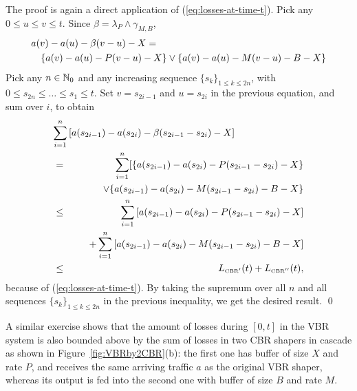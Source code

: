 \pr The proof is again a direct application of (\ref{eq:losses-at-time-t}).
Pick any $0 \leq u \leq v \leq t$. Since $\beta = \lambda_P \wedge \gamma_{M,B}$,
\begin{eqnarray*}
\lefteqn{a(v) - a(u) - \beta(v-u) - X = }\\ && \{ a(v) - a(u) -
P(v-u) - X \} \vee \{ a(v) - a(u) - M(v-u) - B - X \}
\end{eqnarray*}
Pick any $n \in \mathbb{N}_0$ and any increasing sequence $\{ s_k \}_{1 \leq k \leq 2n}$, with $0 \leq s_{2n} \leq \ldots \leq s_1 \leq t$. Set $v = s_{2i-1}$ and $u = s_{2i}$ in the previous equation, and sum over $i$, to obtain
 \begin{eqnarray*}
 \lefteqn{\sum_{i=1}^{n} \left[ a(s_{2i-1})-a(s_{2i})-
 \beta(s_{2i-1}-s_{2i}) -X \right]} \\
 & = & \sum_{i=1}^{n} [ \{ a(s_{2i-1})-a(s_{2i})- P(s_{2i-1}-s_{2i}) - X \} \\
 & & \;\;\;\;\;\;\vee \{ a(s_{2i-1})-a(s_{2i})- M(s_{2i-1}-s_{2i}) -B - X \} \\
 & \leq & \sum_{i=1}^{n} \left[ a(s_{2i-1})-a(s_{2i})- P(s_{2i-1}-s_{2i}) -
 X \right] \\
 & & \;\;\;\;\;\;+ \sum_{i=1}^{n} \left[ a(s_{2i-1})-a(s_{2i})-
 M(s_{2i-1}-s_{2i}) -B - X \right] \\
 & \leq &  L_{\mbox{{\tiny CBR}}^{\prime}}(t) + L_{\mbox{{\tiny
 CBR}}^{\prime \prime}}(t),
\end{eqnarray*}
%
%
%
because of (\ref{eq:losses-at-time-t}). By taking the supremum over all $n$ and all sequences $\{ s_k \}_{1 \leq k \leq 2n}$ in the previous inequality, we get the desired result.
\qed


A similar exercise shows that the amount of losses during
$[0,t]$ in the VBR system is also bounded above by the sum
of losses in two CBR shapers in cascade as
shown in Figure~\ref{fig:VBRby2CBR}(b):
 the first one has buffer of size $X$
and rate $P$, and receives the same arriving traffic $a$ as the
original VBR shaper,
whereas its output is fed into the second  one with buffer of size
$B$ and rate $M$.

